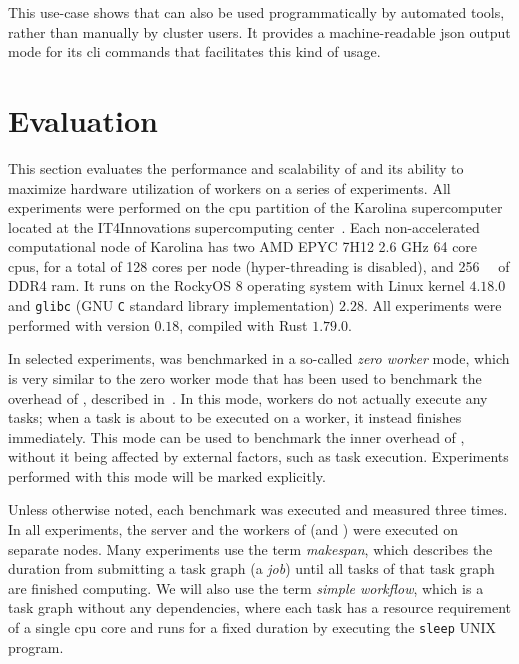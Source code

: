 This use-case shows that \hyperqueue{} can also be used programmatically by automated
tools, rather than manually by cluster users. It provides a machine-readable
\gls{json} output mode for its \gls{cli} commands that facilitates this
kind of usage.

\section{Evaluation}
\label{hq:evaluation}
This section evaluates the performance and scalability of \hyperqueue{} and its ability
to maximize hardware utilization of workers on a series of experiments. All experiments were
performed on the \gls{cpu} partition of the Karolina
supercomputer~\cite{karolina} located at the IT4Innovations supercomputing
center~\cite{it4i}. Each non-accelerated computational node of Karolina has two AMD
EPYC\texttrademark{} 7H12 2.6 GHz 64 core \glspl{cpu}, for a total of 128 cores
per node (hyper-threading is disabled), and \SI{256}{\gibi\byte} of DDR4
\gls{ram}. It runs on the RockyOS 8 operating system with Linux kernel
$4.18.0$ and \texttt{glibc} (GNU \texttt{C} standard library implementation) $2.28$. All experiments were
performed with \hyperqueue{} version $0.18$, compiled with Rust
$1.79.0$.

In selected experiments, \hq{} was benchmarked in a so-called
\emph{zero worker} mode, which is very similar to the zero worker mode that has been used to
benchmark the overhead of \rsds{}, described in~. In this
mode, workers do not actually execute any tasks; when a task is about to be executed on a worker,
it instead finishes immediately. This mode can be used to benchmark the inner overhead of
\hyperqueue{}, without it being affected by external factors, such as task execution.
Experiments performed with this mode will be marked explicitly.

Unless otherwise noted, each benchmark was executed and measured three times. In all experiments,
the server and the workers of \hyperqueue{} (and \dask{}) were executed on separate nodes. Many
experiments use the term \emph{makespan}, which describes the duration from submitting a
task graph (a \hyperqueue{} \emph{job}) until all tasks of that task graph
are finished computing. We will also use the term \emph{simple workflow}, which is a task graph
without any dependencies, where each task has a resource requirement of a single
\gls{cpu} core and runs for a fixed duration by executing the \texttt{sleep}
UNIX program.

